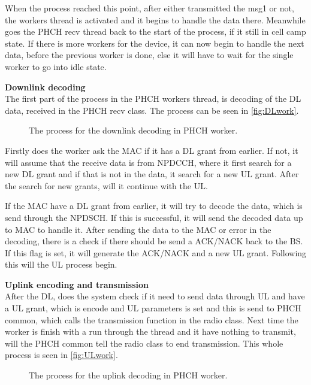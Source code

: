 When the process reached this point, after either transmitted the msg1 or not, the workers thread is activated and it begins to handle the data there. Meanwhile goes the PHCH recv thread back to the start of the process, if it still in cell camp state. If there is more workers for the device, it can now begin to handle the next data, before the previous worker is done, else it will have to wait for the single worker to go into idle state.

\textbf{Downlink decoding} \\
The first part of the process in the PHCH workers thread, is decoding of the DL data, received in the PHCH recv class. The process can be seen in \autoref{fig:DLwork}.

\begin{figure}[H]
\centering
{}
\resizebox{0.8\textwidth}{!}{
}
\caption{The process for the downlink decoding in PHCH worker.}
\label{fig:DLwork}
\end{figure}

Firstly does the worker ask the MAC if it has a DL grant from earlier. If not, it will assume that the receive data is from NPDCCH, where it first search for a new DL grant and if that is not in the data, it search for a new UL grant. After the search for new grants, will it continue with the UL.

If the MAC have a DL grant from earlier, it will try to decode the data, which is send through the NPDSCH. If this is successful, it will send the decoded data up to MAC to handle it. After sending the data to the MAC or error in the decoding, there is a check if there should be send a ACK/NACK back to the BS. If this flag is set, it will generate the ACK/NACK and a new UL grant. Following this will the UL process begin.

\textbf{Uplink encoding and transmission} \\
After the DL, does the system check if it need to send data through UL and have a UL grant, which is encode and UL parameters is set and this is send to PHCH common, which calls the transmission function in the radio class. Next time the worker is finish with a run through the thread and it have nothing to transmit, will the PHCH common tell the radio class to end transmission. This whole process is seen in \autoref{fig:ULwork}.

\begin{figure}[H]
\centering
{}
\resizebox{0.8\textwidth}{!}{
}
\caption{The process for the uplink decoding in PHCH worker.}
\label{fig:ULwork}
\end{figure}



